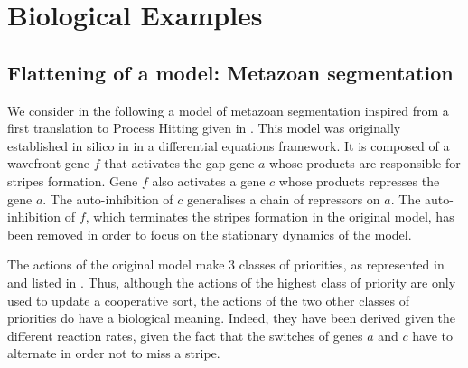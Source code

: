 
\section{Biological Examples}\label{sec:example}




\subsection{Flattening of a model: Metazoan segmentation}
\label{ssec:ex-metazoan}


We consider in the following a model of metazoan segmentation
inspired from a first translation to Process Hitting given in \cite{PMR10-TCSB}.
This model was originally established in silico in \cite{MSB:MSB4100192} in a differential equations framework.
It is composed of a wavefront gene $f$ that activates the gap-gene $a$ whose products are responsible for stripes formation.
Gene $f$ also activates a gene $c$ whose products represses the gene $a$.
The auto-inhibition of $c$ generalises a chain of repressors on $a$.
The auto-inhibition of $f$, which terminates the stripes formation in the original model,
has been removed in order to focus on the stationary dynamics of the model.

The actions of the original model make $3$ classes of priorities, as represented in 
and listed in .
Thus, although the actions of the highest class of priority are only used to update a cooperative sort,
the actions of the two other classes of priorities do have a biological meaning.
Indeed, they have been derived given the different reaction rates,
given the fact that the switches of genes $a$ and $c$ have to alternate in order not to miss a stripe.

